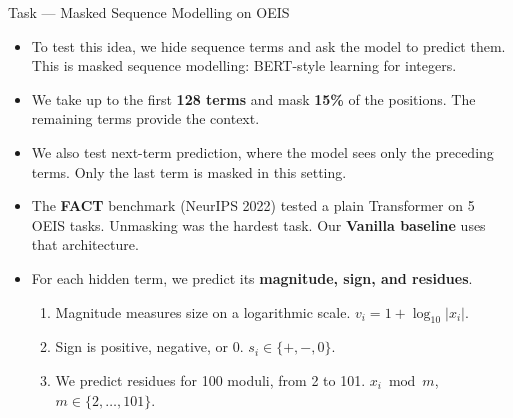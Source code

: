\documentclass[aspectratio=169,10pt]{beamer}
\newcommand{\tightlist}{\setlength{\itemsep}{0.2em}}
\newcommand{\readout}[1]{\textcolor{readoutblue}{{\mdseries #1}}}
\begin{document}
\begin{frame}{Task --- Masked Sequence Modelling on OEIS}
\small
  \begin{itemize}\tightlist
    \item \readout{To test this idea, we hide sequence terms and ask the model to predict them.}
          This is \alert{masked sequence modelling}: BERT-style learning for integers.
    \item We take up to the first \textbf{128 terms} and mask \textbf{15\%} of the positions.
          The remaining terms provide the context.
    \item \readout{We also test next-term prediction, where the model sees only the preceding terms.}
          Only the last term is masked in this setting.
    \item The \textbf{FACT} benchmark (NeurIPS 2022) tested a plain Transformer on 5 OEIS
          tasks. Unmasking was the hardest task.
          Our \textbf{Vanilla baseline} uses that architecture.
    \item \readout{For each hidden term, we predict its \textbf{magnitude, sign, and residues}.}
      \begin{enumerate}
        \item \readout{Magnitude measures size on a logarithmic scale.} $v_i = 1 + \log_{10}|x_i|$.
        \item \readout{Sign is positive, negative, or 0.} $s_i \in \{+, -, 0\}$.
        \item \readout{We predict residues for 100 moduli, from 2 to 101.} $x_i \bmod m$, $m \in \{2, \dots, 101\}$.
      \end{enumerate}
  \end{itemize}
\end{frame}
\end{document}
